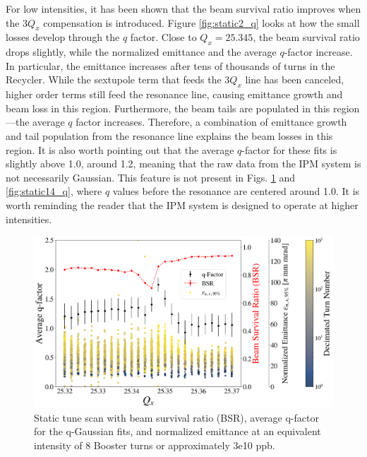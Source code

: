 For low intensities, it has been shown that the beam survival ratio improves when the $3Q_x$ compensation is introduced. Figure \ref{fig:static2_q} looks at how the small losses develop through the $q$ factor. Close to $Q_x=25.345$, the beam survival ratio drops slightly, while the normalized emittance and the average $q$-factor increase. In particular, the emittance increases after tens of thousands of turns in the Recycler. While the sextupole term that feeds the $3Q_x$ line has been canceled, higher order terms still feed the resonance line, causing emittance growth and beam loss in this region. Furthermore, the beam tails are populated in this region---the average $q$ factor increases. Therefore, a combination of emittance growth and tail population from the resonance line explains the beam losses in this region. It is also worth pointing out that the average $q$-factor for these fits is slightly above 1.0, around 1.2, meaning that the raw data from the IPM system is not necessarily Gaussian. This feature is not present in Figs. \ref{fig:static8_q} and \ref{fig:static14_q}, where $q$ values before the resonance are centered around 1.0. It is worth reminding the reader that the IPM system is designed to operate at higher intensities. 

\begin{figure}[H]
    \centering
    \includegraphics[width=\columnwidth]{chapter6/static8turns_emittance_dampersOFF.png}
    \caption{Static tune scan with beam survival ratio (BSR), average q-factor for the q-Gaussian fits, and normalized emittance at an equivalent intensity of 8 Booster turns or approximately 3e10 ppb.}
    \label{fig:static8_q}
\end{figure}

